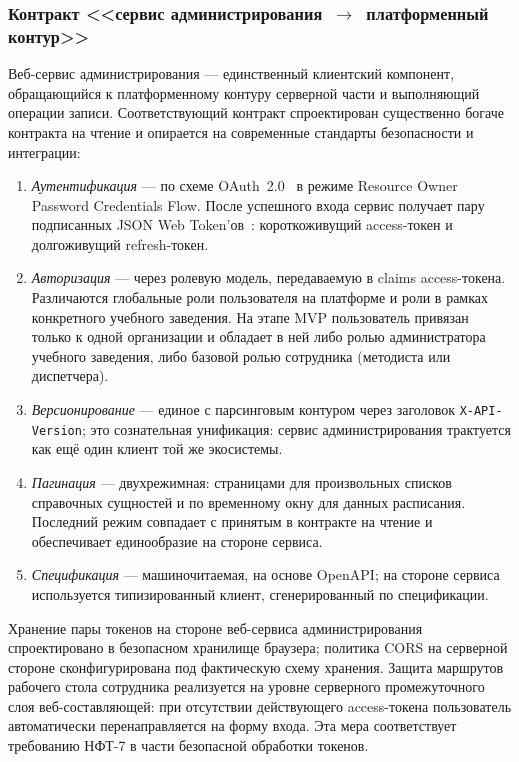 \subsubsection{Контракт <<сервис администрирования~$\to$~платформенный контур>>}
\label{subsubsec:admin-contract}

Веб-сервис администрирования --- единственный клиентский компонент, обращающийся к платформенному контуру серверной части и выполняющий операции записи. Соответствующий контракт спроектирован существенно богаче контракта на чтение и опирается на современные стандарты безопасности и интеграции:

\begin{enumerate}
  \item \emph{Аутентификация} --- по схеме OAuth~2.0~\cite{rfc-6749} в режиме Resource Owner Password Credentials Flow. После успешного входа сервис получает пару подписанных JSON Web Token'ов~\cite{rfc-7519}: короткоживущий access-токен и долгоживущий refresh-токен.
  \item \emph{Авторизация} --- через ролевую модель, передаваемую в claims access-токена. Различаются глобальные роли пользователя на платформе и роли в рамках конкретного учебного заведения. На этапе MVP пользователь привязан только к одной организации и обладает в ней либо ролью администратора учебного заведения, либо базовой ролью сотрудника (методиста или диспетчера).
  \item \emph{Версионирование} --- единое с парсинговым контуром через заголовок \texttt{X-API-Version}; это сознательная унификация: сервис администрирования трактуется как ещё один клиент той же экосистемы.
  \item \emph{Пагинация} --- двухрежимная: страницами для произвольных списков справочных сущностей и по временному окну для данных расписания. Последний режим совпадает с принятым в контракте на чтение и обеспечивает единообразие на стороне сервиса.
  \item \emph{Спецификация} --- машиночитаемая, на основе OpenAPI; на стороне сервиса используется типизированный клиент, сгенерированный по спецификации.
\end{enumerate}

Хранение пары токенов на стороне веб-сервиса администрирования спроектировано в безопасном хранилище браузера; политика CORS на серверной стороне сконфигурирована под фактическую схему хранения. Защита маршрутов рабочего стола сотрудника реализуется на уровне серверного промежуточного слоя веб-составляющей: при отсутствии действующего access-токена пользователь автоматически перенаправляется на форму входа. Эта мера соответствует требованию НФТ-7 в части безопасной обработки токенов.

